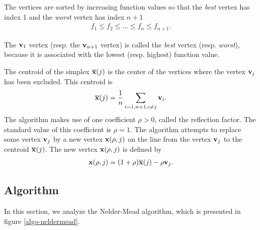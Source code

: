 The vertices are sorted by increasing function values so that the 
\emph{best} vertex has index 1 and the \emph{worst} vertex 
has index $n+1$
\begin{eqnarray}
\label{sorted-vertices-fv}
f_1 \leq f_2 \leq \ldots \leq f_n \leq f_{n+1}.
\end{eqnarray}

The $\mathbf{v}_1$ vertex (resp. the $\mathbf{v}_{n+1}$ vertex) is called the \emph{best} 
vertex (resp. \emph{worst}), because it is associated with the lowest (resp. highest)
function value. 

The centroid of the simplex $\overline{\mathbf{x}} (j)$ is the center of the vertices
where the vertex $\mathbf{v}_j$ has been 
excluded. This centroid is 
\begin{eqnarray}
\label{centroid-generalized}
\overline{\mathbf{x}} (j) = 
\frac{1}{n} \sum_{i=1,n+1, i\neq j} \mathbf{v}_i.
\end{eqnarray}
The algorithm makes use
of one coefficient $\rho>0$, called the reflection factor. The standard
value of this coefficient is $\rho=1$.
The algorithm attempts to replace some vertex 
$\mathbf{v}_j$ by a new vertex $\mathbf{x}(\rho,j)$ on the line from the vertex $\mathbf{v}_j$
to the centroid  $\overline{\mathbf{x}}(j)$. The new vertex $\mathbf{x}(\rho,j)$ is defined by 
\begin{eqnarray}
\label{interpolate-generalized}
\mathbf{x}(\rho,j) = (1+\rho)\overline{\mathbf{x}}(j) - \rho \mathbf{v}_j.
\end{eqnarray}

\subsection{Algorithm}

In this section, we analyze the Nelder-Mead algorithm, which
is presented in figure \ref{algo-neldermead}.

